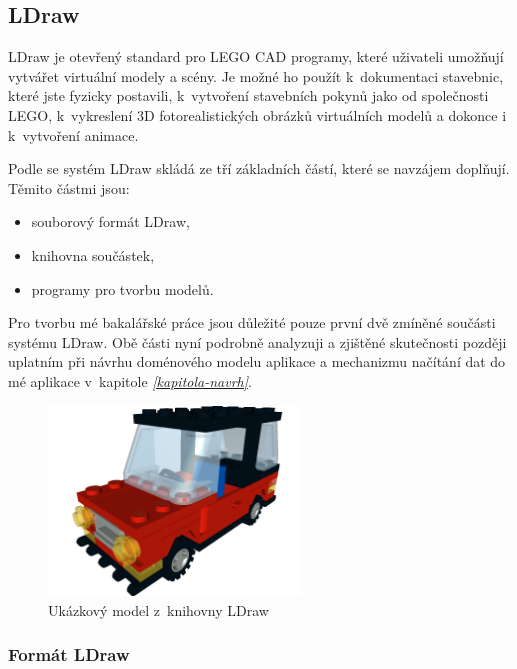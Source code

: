 \subsection{LDraw}\label{reserse-ldraw}  
   
LDraw je otevřený standard pro LEGO \gls{CAD} programy, které uživateli umožňují vytvářet virtuální modely a scény. Je možné ho použít k~dokumentaci stavebnic, které jste fyzicky postavili, k~vytvoření stavebních pokynů jako od společnosti LEGO, k~vykreslení 3D fotorealistických obrázků virtuálních modelů a dokonce i k~vytvoření animace. \autocite{ldraw:homepage}  

Podle \autocite[s.~30]{legobook} se systém LDraw skládá ze tří základních částí, které se navzájem doplňují. Těmito částmi jsou: 

\begin{itemize}
    \item souborový formát LDraw,
    \item knihovna součástek,
    \item programy pro tvorbu modelů. 
\end{itemize}

Pro tvorbu mé bakalářské práce jsou důležité pouze první dvě zmíněné součásti systému LDraw. Obě části nyní podrobně analyzuji a zjištěné skutečnosti později uplatním při návrhu doménového modelu aplikace a mechanizmu načítání dat do mé aplikace v~kapitole \emph{\ref{kapitola-navrh}}.
    
\begin{figure}[htbp]
        \centering
        \includegraphics[width=0.6\textwidth,height=\textheight,keepaspectratio]{images/car.png}
        \caption{Ukázkový model z~knihovny LDraw \autocite{ldraw:car}}
\end{figure}

    \subsubsection*{Formát LDraw}\label{ldraw-format}
    
